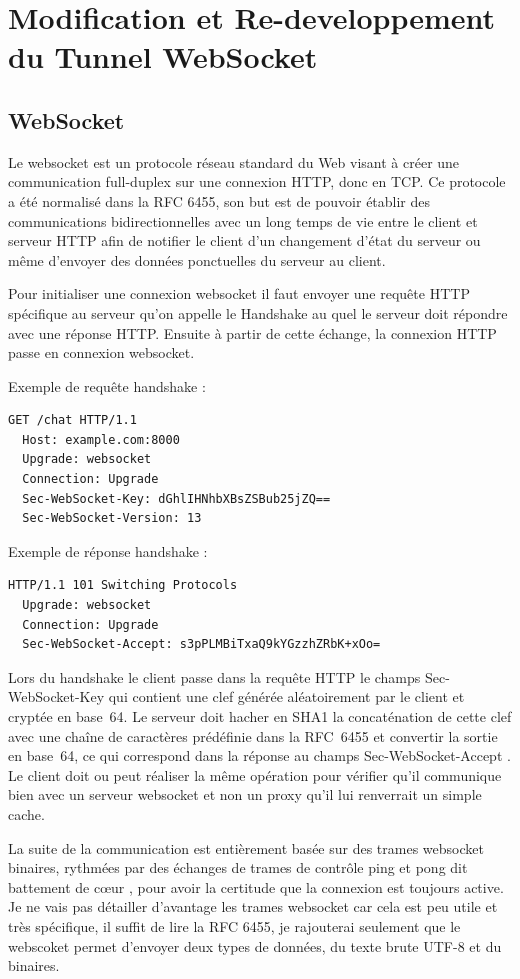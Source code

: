 \section{Modification et Re-developpement du Tunnel WebSocket}

\subsection{WebSocket}

Le websocket est un protocole réseau standard du Web visant à créer
une communication full-duplex sur une connexion HTTP, donc en TCP. Ce
protocole a été normalisé dans la RFC 6455, son but est de pouvoir
établir des communications bidirectionnelles avec un long temps de vie
entre le client et serveur HTTP afin de notifier le client d'un
changement d'état du serveur ou même d'envoyer des données ponctuelles
du serveur au client.

Pour initialiser une connexion websocket il faut envoyer une requête
HTTP spécifique au serveur qu'on appelle le \og Handshake \fg{} au
quel le serveur doit répondre avec une réponse HTTP. Ensuite à partir
de cette échange, la connexion HTTP passe en connexion websocket.

Exemple de requête handshake :
\begin{lstlisting}[language=bash]
  GET /chat HTTP/1.1
  Host: example.com:8000
  Upgrade: websocket
  Connection: Upgrade
  Sec-WebSocket-Key: dGhlIHNhbXBsZSBub25jZQ==
  Sec-WebSocket-Version: 13
\end{lstlisting}

Exemple de réponse handshake :
\begin{lstlisting}[language=bash]
  HTTP/1.1 101 Switching Protocols
  Upgrade: websocket
  Connection: Upgrade
  Sec-WebSocket-Accept: s3pPLMBiTxaQ9kYGzzhZRbK+xOo=
\end{lstlisting}

Lors du handshake le client passe dans la requête HTTP le champs \og
Sec-WebSocket-Key \fg{} qui contient une clef générée aléatoirement
par le client et cryptée en base~64. Le serveur doit hacher en SHA1 la
concaténation de cette clef avec une chaîne de caractères prédéfinie
dans la RFC~6455 et convertir la sortie en base~64, ce qui correspond
dans la réponse au champs \og Sec-WebSocket-Accept \fg{}. Le client
doit ou peut réaliser la même opération pour vérifier qu'il communique
bien avec un serveur websocket et non un proxy qu'il lui renverrait un
simple cache.

La suite de la communication est entièrement basée sur des trames
websocket binaires, rythmées par des échanges de trames de contrôle
ping et pong dit \og battement de cœur \fg{}, pour avoir la certitude
que la connexion est toujours active. Je ne vais pas détailler
d'avantage les trames websocket car cela est peu utile et très
spécifique, il suffit de lire la RFC 6455, je rajouterai seulement que
le webscoket permet d'envoyer deux types de données, du texte brute
UTF-8 et du binaires.

